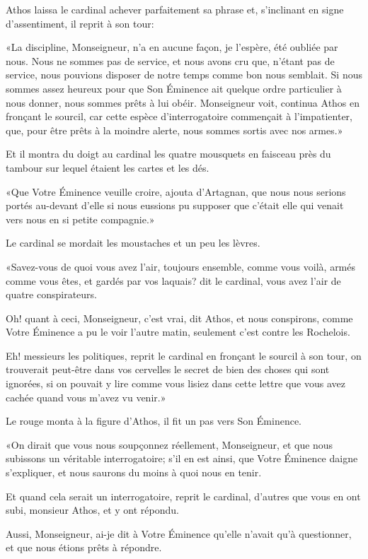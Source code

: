 Athos laissa le cardinal achever parfaitement sa phrase et, s'inclinant en signe d'assentiment, il reprit à son tour: 

«La discipline, Monseigneur, n'a en aucune façon, je l'espère, été oubliée par nous. Nous ne sommes pas de service, et nous avons cru que, n'étant pas de service, nous pouvions disposer de notre temps comme bon nous semblait. Si nous sommes assez heureux pour que Son Éminence ait quelque ordre particulier à nous donner, nous sommes prêts à lui obéir. Monseigneur voit, continua Athos en fronçant le sourcil, car cette espèce d'interrogatoire commençait à l'impatienter, que, pour être prêts à la moindre alerte, nous sommes sortis avec nos armes.» 

Et il montra du doigt au cardinal les quatre mousquets en faisceau près du tambour sur lequel étaient les cartes et les dés. 

«Que Votre Éminence veuille croire, ajouta d'Artagnan, que nous nous serions portés au-devant d'elle si nous eussions pu supposer que c'était elle qui venait vers nous en si petite compagnie.» 

Le cardinal se mordait les moustaches et un peu les lèvres. 

«Savez-vous de quoi vous avez l'air, toujours ensemble, comme vous voilà, armés comme vous êtes, et gardés par vos laquais? dit le cardinal, vous avez l'air de quatre conspirateurs. 

\speak  Oh! quant à ceci, Monseigneur, c'est vrai, dit Athos, et nous conspirons, comme Votre Éminence a pu le voir l'autre matin, seulement c'est contre les Rochelois. 

\speak  Eh! messieurs les politiques, reprit le cardinal en fronçant le sourcil à son tour, on trouverait peut-être dans vos cervelles le secret de bien des choses qui sont ignorées, si on pouvait y lire comme vous lisiez dans cette lettre que vous avez cachée quand vous m'avez vu venir.» 

Le rouge monta à la figure d'Athos, il fit un pas vers Son Éminence. 

«On dirait que vous nous soupçonnez réellement, Monseigneur, et que nous subissons un véritable interrogatoire; s'il en est ainsi, que Votre Éminence daigne s'expliquer, et nous saurons du moins à quoi nous en tenir. 

\speak  Et quand cela serait un interrogatoire, reprit le cardinal, d'autres que vous en ont subi, monsieur Athos, et y ont répondu. 

\speak  Aussi, Monseigneur, ai-je dit à Votre Éminence qu'elle n'avait qu'à questionner, et que nous étions prêts à répondre. 

